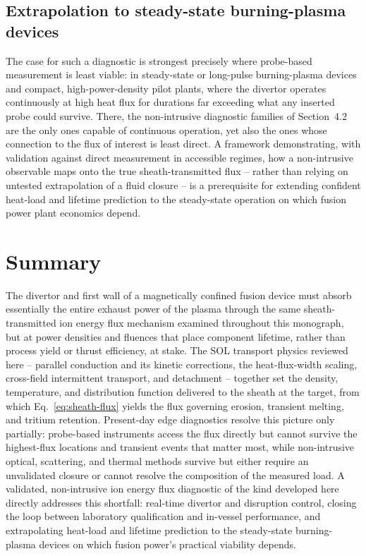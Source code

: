 \subsection{Extrapolation to steady-state burning-plasma devices}

The case for such a diagnostic is strongest precisely where probe-based measurement is least viable: in steady-state or long-pulse burning-plasma devices and compact, high-power-density pilot plants, where the divertor operates continuously at high heat flux for durations far exceeding what any inserted probe could survive. There, the non-intrusive diagnostic families of Section~4.2 are the only ones capable of continuous operation, yet also the ones whose connection to the flux of interest is least direct. A framework demonstrating, with validation against direct measurement in accessible regimes, how a non-intrusive observable maps onto the true sheath-transmitted flux -- rather than relying on untested extrapolation of a fluid closure -- is a prerequisite for extending confident heat-load and lifetime prediction to the steady-state operation on which fusion power plant economics depend.

\section{Summary}

The divertor and first wall of a magnetically confined fusion device must absorb essentially the entire exhaust power of the plasma through the same sheath-transmitted ion energy flux mechanism examined throughout this monograph, but at power densities and fluences that place component lifetime, rather than process yield or thrust efficiency, at stake. The SOL transport physics reviewed here -- parallel conduction and its kinetic corrections, the heat-flux-width scaling, cross-field intermittent transport, and detachment -- together set the density, temperature, and distribution function delivered to the sheath at the target, from which Eq.~\eqref{eq:sheath-flux} yields the flux governing erosion, transient melting, and tritium retention. Present-day edge diagnostics resolve this picture only partially: probe-based instruments access the flux directly but cannot survive the highest-flux locations and transient events that matter most, while non-intrusive optical, scattering, and thermal methods survive but either require an unvalidated closure or cannot resolve the composition of the measured load. A validated, non-intrusive ion energy flux diagnostic of the kind developed here directly addresses this shortfall: real-time divertor and disruption control, closing the loop between laboratory qualification and in-vessel performance, and extrapolating heat-load and lifetime prediction to the steady-state burning-plasma devices on which fusion power's practical viability depends.
